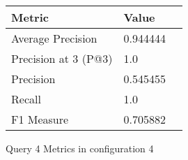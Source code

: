 \begin{figure}[H]
\begin{center}
\begin{tabular}{lll}
\toprule
{}                      Metric &         Value \\
\midrule
     Average Precision &  0.944444 \\
  Precision at 3 (P@3) &       1.0 \\
             Precision &  0.545455 \\
                Recall &       1.0 \\
            F1 Measure &  0.705882 \\
\bottomrule
\end{tabular}
\end{center}
\caption{Query 4 Metrics in configuration 4}
\label{fig:query_4_metrics_config_4}
\end{figure}